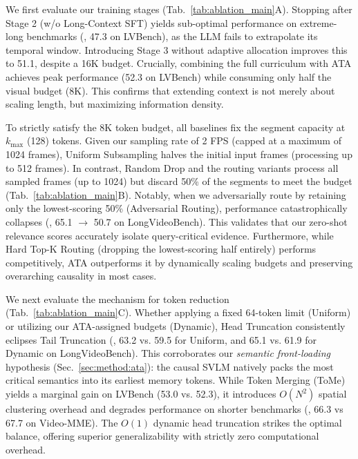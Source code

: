 %
We first evaluate our training stages (Tab.~\ref{tab:ablation_main}A). Stopping after Stage 2 (w/o Long-Context SFT) yields sub-optimal performance on extreme-long benchmarks (\eg, 47.3 on LVBench), as the LLM fails to extrapolate its temporal window. Introducing Stage 3 without adaptive allocation improves this to 51.1, despite a 16K budget. Crucially, combining the full curriculum with ATA achieves peak performance (52.3 on LVBench) while consuming only half the visual budget (8K). This confirms that extending context is not merely about scaling length, but maximizing information density.

%
To strictly satisfy the 8K token budget, all baselines fix the segment capacity at $k_{\max}$ (128) tokens. Given our sampling rate of 2 FPS (capped at a maximum of 1024 frames), Uniform Subsampling halves the initial input frames (processing up to 512 frames). In contrast, Random Drop and the routing variants process all sampled frames (up to 1024) but discard 50\% of the segments to meet the budget (Tab.~\ref{tab:ablation_main}B).
%
Notably, when we adversarially route by retaining only the lowest-scoring 50\% (Adversarial Routing), performance catastrophically collapses (\eg, 65.1 $\rightarrow$ 50.7 on LongVideoBench). This validates that our zero-shot relevance scores accurately isolate query-critical evidence. Furthermore, while Hard Top-K Routing (dropping the lowest-scoring half entirely) performs competitively, ATA outperforms it by dynamically scaling budgets and preserving overarching causality in most cases.

%
We next evaluate the mechanism for token reduction (Tab.~\ref{tab:ablation_main}C). Whether applying a fixed 64-token limit (Uniform) or utilizing our ATA-assigned budgets (Dynamic), Head Truncation consistently eclipses Tail Truncation (\eg, 63.2 vs. 59.5 for Uniform, and 65.1 vs. 61.9 for Dynamic on LongVideoBench). This corroborates our \emph{semantic front-loading} hypothesis (Sec.~\ref{sec:method:ata}): the causal SVLM natively packs the most critical semantics into its earliest memory tokens.
%
While Token Merging (ToMe) yields a marginal gain on LVBench (53.0 vs. 52.3), it introduces $O(N^2)$ spatial clustering overhead and degrades performance on shorter benchmarks (\eg, 66.3 vs 67.7 on Video-MME). The $O(1)$ dynamic head truncation strikes the optimal balance, offering superior generalizability with strictly zero computational overhead.

